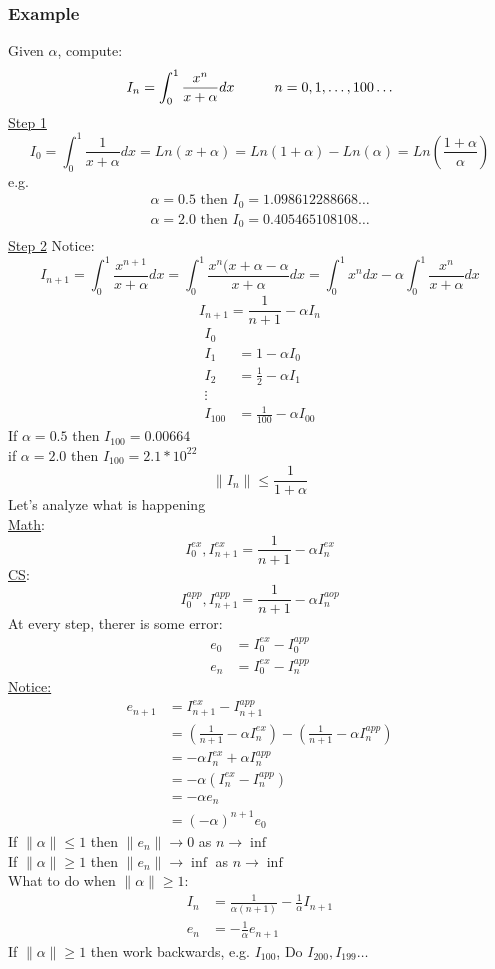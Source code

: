 \documentclass[10pt,usletter]{article}
\newcommand{\tab}[1][1cm]{\hspace*{#1}}
\begin{document}
\subsubsection{Example}
Given $\alpha$, compute: $$I_n=\int_0^1\frac{x^n}{x+\alpha}dx \tab n=0,1,\hdots,100\hdots$$
\underline{Step 1} $$I_0=\int_0^1 \frac{1}{x+\alpha}dx=Ln(x+\alpha)=Ln(1+\alpha)-Ln(\alpha)=Ln\left(\frac{1+\alpha}{\alpha}\right)$$
e.g.
\begin{align*}
\alpha = 0.5 \text{ then } I_0=1.098612288668\hdots\\
\alpha = 2.0 \text{ then } I_0=0.405465108108\hdots\\
\end{align*}
\underline{Step 2} \tab Notice: $$I_{n+1}=\int_0^1\frac{x^{n+1}}{x+\alpha}dx=\int_0^1\frac{x^n(x+\alpha-\alpha}{x+\alpha}dx=\int_0^1x^ndx-\alpha\int_0^1\frac{x^n}{x+\alpha}dx$$
$$I_{n+1}=\frac{1}{n+1}-\alpha I_n$$
\begin{align*}
I_0&\\
I_1 &= 1-\alpha I_0\\
I_2 &= \frac{1}{2} - \alpha I_1\\
\vdots\\
I_{100} &= \frac{1}{100} - \alpha I_00
\end{align*}
If $\alpha = 0.5$ then $I_{100} = 0.00664$\\
if $\alpha = 2.0$ then $I_{100} = 2.1 * 10^{22}$\\
$$\|I_n\| \leq \frac{1}{1+\alpha}$$
Let's analyze what is happening \\
\underline{Math}: $$I_0^{ex}, I_{n+1}^{ex}=\frac{1}{n+1}-\alpha I_n^{ex}$$ 
\underline{CS}:	$$I_0^{app}, I_{n+1}^{app}=\frac{1}{n+1}-\alpha I_n^{aop}$$
At every step, therer is some error:
\begin{align*}
e_0&=I_0^{ex}-I_0^{app} \\
e_n&=I_0^{ex}-I_n^{app}
\end{align*}
\underline{Notice:} 
\begin{align*}
e_{n+1}&=I_{n+1}^{ex}-I_{n+1}^{app} \\
&=\left(\frac{1}{n+1}-\alpha I_n^{ex}\right)-\left(\frac{1}{n+1}-\alpha I_n^{app}\right) \\
&=-\alpha I_n^{ex}+\alpha I_n^{app} \\
&=-\alpha \left(I_n^{ex}-I_n^{app}\right) \\
&=-\alpha e_n \\
&=(-\alpha)^{n+1}e_0
\end{align*}
If $\|\alpha\|\le 1$ then $\|e_n\|\rightarrow 0$ as $n\rightarrow \inf$\\
If $\|\alpha\|\ge 1$ then $\|e_n\|\rightarrow \inf$ as $n\rightarrow \inf$\\
What to do when $\|\alpha\| \ge 1$:
\begin{align*}
I_n&=\frac{1}{\alpha (n+1)} - \frac{1}{\alpha} I_{n+1}\\
e_n&=-\frac{1}{\alpha}e_{n+1}
\end{align*}
If $\|\alpha\| \ge 1$ then work backwards, e.g. $I_{100}$, Do $I_{200}, I_{199}\hdots$
\end{document}
